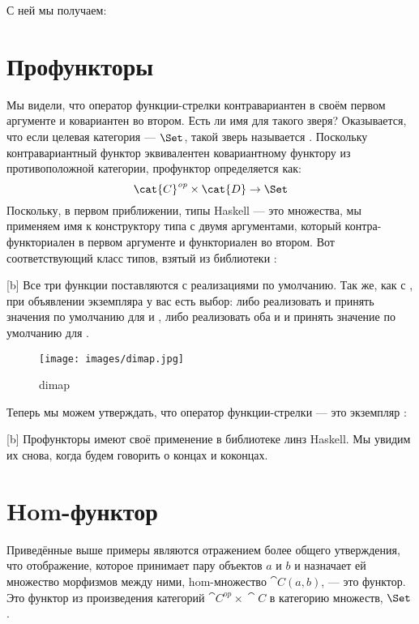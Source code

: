 С ней мы получаем:


\section{Профункторы}

Мы видели, что оператор функции-стрелки контравариантен в своём
первом аргументе и ковариантен во втором. Есть ли имя для такого
зверя? Оказывается, что если целевая категория --- $\Set$, такой
зверь называется . Поскольку контравариантный функтор
эквивалентен ковариантному функтору из противоположной категории,
профунктор определяется как:
\[\cat{C}^\mathit{op} \times \cat{D} \to \Set\]
Поскольку, в первом приближении, типы Haskell --- это множества, мы применяем имя
 к конструктору типа  с двумя аргументами,
который контра-функториален в первом аргументе и функториален во
втором. Вот соответствующий класс типов, взятый из
библиотеки :

[b]
Все три функции поставляются с реализациями по умолчанию. Так же, как с
, при объявлении экземпляра 
у вас есть выбор: либо реализовать  и принять
значения по умолчанию для  и , либо реализовать оба
 и  и принять значение по умолчанию для
.

\begin{figure}[H]
  \centering
  \texttt{[image: images/dimap.jpg]}
  \caption{dimap}
\end{figure}

\noindent
Теперь мы можем утверждать, что оператор функции-стрелки --- это экземпляр
:

[b]
Профункторы имеют своё применение в библиотеке линз Haskell. Мы
увидим их снова, когда будем говорить о концах и коконцах.

\section{Hom-функтор}

Приведённые выше примеры являются отражением более общего утверждения, что
отображение, которое принимает пару объектов $a$ и $b$ и
назначает ей множество морфизмов между ними, hom-множество
$\cat{C}(a, b)$, --- это функтор. Это функтор из произведения
категорий $\cat{C}^\mathit{op}\times{}\cat{C}$ в категорию множеств, $\Set$.

